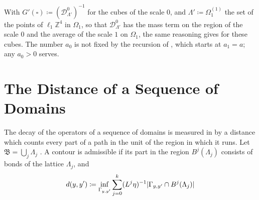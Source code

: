\documentclass[11pt]{preprint}
\DeclarePairedDelimiter{\abs}{\lvert}{\rvert}
\numberwithin{equation}{section}
\theoremstyle{definition}
\theoremstyle{remark}
\theoremstyle{plain}
\begin{document}
With $G'(\square) \coloneqq (\mathcal D^0_{\Lambda'})^{-1}$ for the cubes of the scale $0$, and $\Lambda' \coloneqq \Omega^{(1)}_1$ the set of the points of $\ell_1\mathbb Z^4$ in $\Omega_1$, so that $\mathcal D^0_{\Lambda'}$ has the mass term on the region of the scale $0$ and the average of the scale $1$ on $\Omega_1$, the same reasoning gives \cite[(2.38), (2.44)]{BalabanPRT2} for these cubes. The number $a_0$ is not fixed by the recursion of \cite[(2.14)]{BalabanPRT2}, which starts at $a_1 = a$; any $a_0 > 0$ serves.

\section{The Distance of a Sequence of Domains}\label{sec:distance}

The decay of the operators of a sequence of domains is measured in \cite{BalabanPRT2} by a distance which counts every part of a path in the unit of the region in which it runs. Let $\mathfrak B = \bigcup_j\Lambda_j$ \cite[(2.45)]{BalabanPRT2}. A contour is admissible if its part in the region $B^j(\Lambda_j)$ consists of bonds of the lattice $\Lambda_j$, and
\begin{equation}\label{eq:scaled-distance}
    d(y, y') \coloneqq \inf_{\Gamma_{y,y'}}\sum_{j=0}^{k}(L^j\eta)^{-1}\abs{\Gamma_{y,y'} \cap B^j(\Lambda_j)}
\end{equation}
\end{document}
